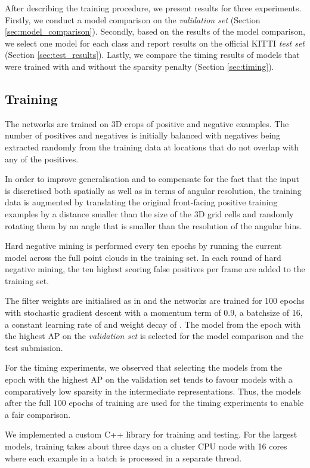 \documentclass[letterpaper, 10 pt, conference]{tex_style/ieeeconf}
\begin{document}
After describing the training procedure, we present results for three experiments.
Firstly, we conduct a model comparison on the \emph{validation set} (Section \ref{sec:model_comparison}).
Secondly, based on the results of the model comparison, we select one model for each class and report results on the official KITTI \emph{test set} (Section \ref{sec:test_results}).
Lastly, we compare the timing results of models that were trained with and without the  sparsity penalty (Section \ref{sec:timing}).



\subsection{Training}
The networks are trained on 3D crops of positive and negative examples.
The number of positives and negatives is initially balanced with negatives being extracted randomly from the training data at locations that do not overlap with any of the positives.

In order to improve generalisation and to compensate for the fact that the input is discretised both spatially as well as in terms of angular resolution, the training data is augmented by translating the original front-facing positive training examples by a distance smaller than the size of the 3D grid cells and randomly rotating them by an angle that is smaller than the resolution of the angular bins.

Hard negative mining is performed every ten epochs by running the current model across the full point clouds in the training set.
In each round of hard negative mining, the ten highest scoring false positives per frame are added to the training set.

The filter weights are initialised as in \cite{he2015delving} and the networks are trained for 100 epochs with stochastic gradient descent with a momentum term of 0.9, a batchsize of 16, a constant learning rate of  and  weight decay of .
The model from the epoch with the highest AP on the \emph{validation set} is selected for the model comparison and the test submission.

For the timing experiments, we observed that selecting the models from the epoch with the highest AP on the validation set tends to favour models with a comparatively low sparsity in the intermediate representations.
Thus, the models after the full 100 epochs of training are used for the timing experiments to enable a fair comparison.

We implemented a custom C++ library for training and testing. For the largest models, training takes about three days on a cluster CPU node with 16 cores where each example in a batch is processed in a separate thread.
\end{document}
